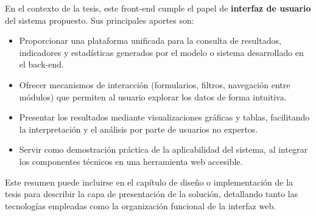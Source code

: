 En el contexto de la tesis, este front-end cumple el papel de \textbf{interfaz de usuario} del sistema propuesto. Sus principales aportes son:

\begin{itemize}
  \item Proporcionar una plataforma unificada para la consulta de resultados, indicadores y estadísticas generados por el modelo o sistema desarrollado en el back-end.
  \item Ofrecer mecanismos de interacción (formularios, filtros, navegación entre módulos) que permiten al usuario explorar los datos de forma intuitiva.
  \item Presentar los resultados mediante visualizaciones gráficas y tablas, facilitando la interpretación y el análisis por parte de usuarios no expertos.
  \item Servir como demostración práctica de la aplicabilidad del sistema, al integrar los componentes técnicos en una herramienta web accesible.
\end{itemize}

Este resumen puede incluirse en el capítulo de diseño o implementación de la tesis para describir la capa de presentación de la solución, detallando tanto las tecnologías empleadas como la organización funcional de la interfaz web.
